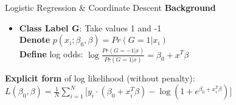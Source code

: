 \documentclass[handout]{beamer}
\begin{document}
\begin{frame}{Logistic Regression \& Coordinate Descent}
\textbf{Background}
\vspace*{3mm}

    \begin{itemize}
        \item \textbf{Class Label G}: Take values 1 and -1 \\
         \vspace*{1mm}
          \textbf{Denote} \(p(x_{i};\beta_0,\beta) = Pr(G=1\lvert x_{i})\) \\
          \vspace*{1mm}
     \textbf{Define} log odds: \(\log\frac{Pr(G=-1 \lvert x)}{Pr(G=1 \lvert x)} = \beta_0 +x^T \beta\) \\

    \end{itemize}
 {
\textbf{Explicit form} of log likelihood (without penalty): \(L(\beta_0,\beta)=\frac{1}{N}\sum_{i=1}^{N}\big[ y_i \cdot(\beta_0 +x_i^T \beta) -\log(1+e^{\beta_0 +x_i^T \beta})\big]\)
}
 
\end{frame}
\end{document}
